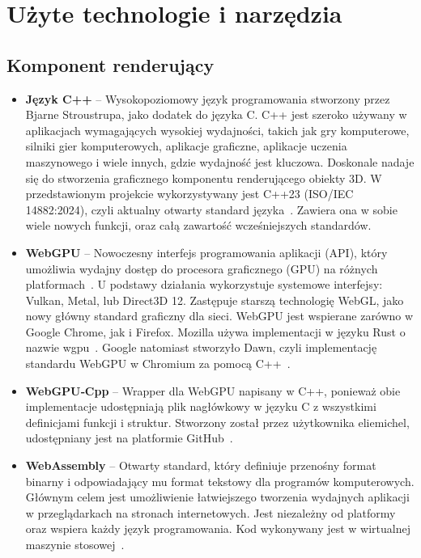 \section{Użyte technologie i narzędzia}

\subsection{Komponent renderujący}

\begin{itemize}
  \item \textbf{Język C++} -- Wysokopoziomowy język programowania stworzony przez Bjarne Stroustrupa, jako dodatek do języka C. C++ jest szeroko używany w aplikacjach wymagających wysokiej wydajności, takich jak gry komputerowe, silniki gier komputerowych, aplikacje graficzne, aplikacje uczenia maszynowego i wiele innych, gdzie wydajność jest kluczowa. Doskonale nadaje się do stworzenia graficznego komponentu renderującego obiekty 3D. W przedstawionym projekcie wykorzystywany jest C++23 (ISO/IEC 14882:2024), czyli aktualny otwarty standard języka~\cite{ISO-IEC-14882-2024}. Zawiera ona w sobie wiele nowych funkcji, oraz całą zawartość wcześniejszych standardów.
  \item \textbf{WebGPU} -- Nowoczesny interfejs programowania aplikacji (API), który umożliwia wydajny dostęp do procesora graficznego (GPU) na różnych platformach~\cite{WebGPU-draft}. U podstawy działania wykorzystuje systemowe interfejsy: Vulkan, Metal, lub Direct3D 12. Zastępuje starszą technologię WebGL, jako nowy główny standard graficzny dla sieci. WebGPU jest wspierane zarówno w Google Chrome, jak i Firefox. Mozilla używa implementacji w języku Rust o nazwie wgpu~\cite{wgpu}. Google natomiast stworzyło Dawn, czyli implementację standardu WebGPU w Chromium za pomocą C++~\cite{Dawn}.
  \item \textbf{WebGPU‑Cpp} -- Wrapper dla WebGPU napisany w C++, ponieważ obie implementacje udostępniają plik nagłówkowy w języku C z wszystkimi definicjami funkcji i struktur. Stworzony został przez użytkownika eliemichel, udostępniany jest na platformie GitHub~\cite{WebGPU-Cpp}.
  \item \textbf{WebAssembly} -- Otwarty standard, który definiuje przenośny format binarny i odpowiadający mu format tekstowy dla programów komputerowych. Głównym celem jest umożliwienie łatwiejszego tworzenia wydajnych aplikacji w przeglądarkach na stronach internetowych. Jest niezależny od platformy oraz wspiera każdy język programowania. Kod wykonywany jest w wirtualnej maszynie stosowej~\cite{WebAssembly}.

\end{itemize}
